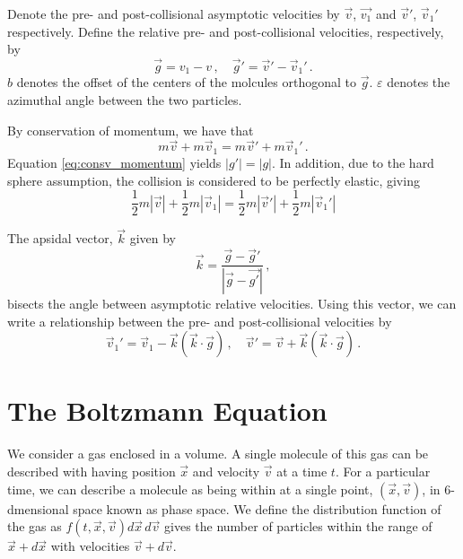 \documentclass[12pt]{CSUNthesis}
\newcommand{\vecv}{\vec{v}}
\begin{document}
	 Denote the pre- and post-collisional asymptotic velocities by $\vec{v}$, $\vec{v_1}$ and $\vec{v}'$, $\vec{v}_1'$ respectively. Define the relative pre- and post-collisional velocities, respectively, by 
\begin{equation*}
	\vec{g} = v_1 - v\, , \quad \vec{g}' = \vec{v}'-\vec{v}_1' \, .
\end{equation*}
$b$ denotes the offset of the centers of the molcules orthogonal to $\vec{g}$. $\varepsilon$ denotes the azimuthal angle between the two particles. 

By conservation of momentum, we have that 
\begin{equation}
\label{eq:consv_momentum}
m \vecv + m \vecv_1 = m\vecv' + m\vecv_1'\, .
\end{equation}
Equation \ref{eq:consv_momentum} yields $|g'| = |g|$. In addition, due to the hard sphere assumption, the collision is considered to be perfectly elastic, giving
\begin{equation}
\label{eq:consv_kin}
\frac{1}{2} m|\vecv| + \frac{1}{2} m|\vecv_1| = \frac{1}{2}m|\vecv'| + \frac{1}{2}m|\vecv_1'|
\end{equation}

The apsidal vector, $\vec{k}$ given by
\begin{equation*}
\vec{k} = \frac{\vec{g} - \vec{g}'}{|\vec{g} - \vec{g'}|}\, ,
\end{equation*}
bisects the angle between asymptotic relative velocities. Using this vector, we can write a relationship between the pre- and post-collisional velocities by
\begin{equation}
\label{eq:vel_relation}
\vec{v}_1' = \vec{v}_1 - \vec{k}(\vec{k} \cdot \vec{g})\, , \quad \vec{v}' = \vec{v} + \vec{k}(\vec{k} \cdot \vec{g})\, .
\end{equation}


\section{The Boltzmann Equation}

We consider a gas enclosed in a volume. A single molecule of this gas can be described with having position $\vec{x}$ and velocity $\vec{v}$ at a time $t$. For a particular time, we can describe a molecule as being within at a single point, $(\vec{x},\vec{v})$, in 6-dmensional space known as phase space. We define the distribution function of the gas as $f(t,\vec{x},\vec{v})d\vec{x}\,d\vec{v}$ gives the number of particles within the range of $\vec{x} + d\vec{x}$ with velocities $\vec{v} + d\vec{v}$. 
\end{document}
